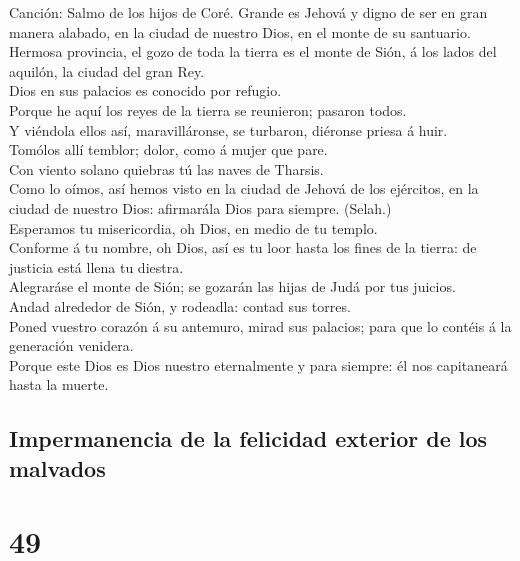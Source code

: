  Canción: Salmo de los hijos de Coré. Grande es Jehová y
digno de ser en gran manera alabado, en la ciudad de nuestro Dios, en el
monte de su santuario.\\
 Hermosa provincia, el gozo de toda la tierra es el monte
de Sión, á los lados del aquilón, la ciudad del gran Rey.\\
 Dios en sus palacios es conocido por refugio.\\
 Porque he aquí los reyes de la tierra se reunieron;
pasaron todos.\\
 Y viéndola ellos así, maravilláronse, se turbaron,
diéronse priesa á huir.\\
 Tomólos allí temblor; dolor, como á mujer que pare.\\
 Con viento solano quiebras tú las naves de Tharsis.\\
 Como lo oímos, así hemos visto en la ciudad de Jehová de
los ejércitos, en la ciudad de nuestro Dios: afirmarála Dios para
siempre. (Selah.)\\
 Esperamos tu misericordia, oh Dios, en medio de tu
templo.\\
 Conforme á tu nombre, oh Dios, así es tu loor hasta los
fines de la tierra: de justicia está llena tu diestra.\\
 Alegraráse el monte de Sión; se gozarán las hijas de
Judá por tus juicios.\\
 Andad alrededor de Sión, y rodeadla: contad sus
torres.\\
 Poned vuestro corazón á su antemuro, mirad sus palacios;
para que lo contéis á la generación venidera.\\
 Porque este Dios es Dios nuestro eternalmente y para
siempre: él nos capitaneará hasta la muerte.

\hypertarget{impermanencia-de-la-felicidad-exterior-de-los-malvados}{%
\subsection{Impermanencia de la felicidad exterior de los
malvados}\label{impermanencia-de-la-felicidad-exterior-de-los-malvados}}

\hypertarget{section-48}{%
\section{49}\label{section-48}}

